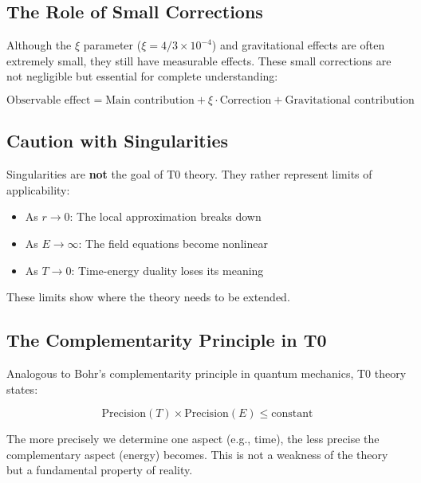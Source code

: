 \documentclass[12pt,a4paper]{article}
\begin{document}
	\subsection{The Role of Small Corrections}
	
	Although the $\xi$ parameter ($\xi = 4/3 \times 10^{-4}$) and gravitational effects are often extremely small, they still have measurable effects. These small corrections are not negligible but essential for complete understanding:
	
	\begin{equation}
		\text{Observable effect} = \text{Main contribution} + \xi \cdot \text{Correction} + \text{Gravitational contribution}
	\end{equation}
	
	\subsection{Caution with Singularities}
	
	\begin{tcolorbox}[colback=t0yellow!10!white, colframe=t0yellow!75!black, title=Important Insight]
		Singularities are \textbf{not} the goal of T0 theory. They rather represent limits of applicability:
		\begin{itemize}
			\item As $r \to 0$: The local approximation breaks down
			\item As $E \to \infty$: The field equations become nonlinear
			\item As $T \to 0$: Time-energy duality loses its meaning
		\end{itemize}
		These limits show where the theory needs to be extended.
	\end{tcolorbox}
	
	\subsection{The Complementarity Principle in T0}
	
	Analogous to Bohr's complementarity principle in quantum mechanics, T0 theory states:
	
	\begin{equation}
		\text{Precision}(T) \times \text{Precision}(E) \leq \text{constant}
	\end{equation}
	
	The more precisely we determine one aspect (e.g., time), the less precise the complementary aspect (energy) becomes. This is not a weakness of the theory but a fundamental property of reality.
	
\end{document}
